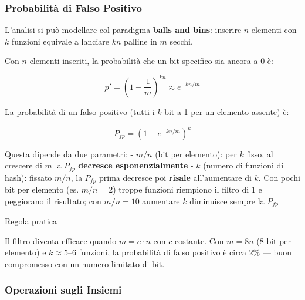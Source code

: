 \documentclass[
  italian,
  openany]{book}
\begin{document}
\subsubsection{Probabilità di Falso
Positivo}\label{probabilituxe0-di-falso-positivo}

L'analisi si può modellare col paradigma \textbf{balls and bins}:
inserire \(n\) elementi con \(k\) funzioni equivale a lanciare \(kn\)
palline in \(m\) secchi.

Con \(n\) elementi inseriti, la probabilità che un bit specifico sia
ancora a 0 è:

\[p' = \left(1 - \frac{1}{m}\right)^{kn} \approx e^{-kn/m}\]

La probabilità di un falso positivo (tutti i \(k\) bit a 1 per un
elemento assente) è:

\[P_{fp} = \left(1 - e^{-kn/m}\right)^k\]

Questa dipende da due parametri: - \textbf{\(m/n\)} (bit per elemento):
per \(k\) fisso, al crescere di \(m\) la \(P_{fp}\) \textbf{decresce
esponenzialmente} - \textbf{\(k\)} (numero di funzioni di hash): fissato
\(m/n\), la \(P_{fp}\) prima decresce poi \textbf{risale} all'aumentare
di \(k\). Con pochi bit per elemento (es. \(m/n = 2\)) troppe funzioni
riempiono il filtro di 1 e peggiorano il risultato; con \(m/n = 10\)
aumentare \(k\) diminuisce sempre la \(P_{fp}\)

\begin{callouttip}{Regola pratica}

Il filtro diventa efficace quando \(m = c \cdot n\) con \(c\) costante.
Con \(m = 8n\) (8 bit per elemento) e \(k \approx 5\text{–}6\) funzioni,
la probabilità di falso positivo è circa \(2\%\) --- buon compromesso
con un numero limitato di bit.

\end{callouttip}

\subsubsection{Operazioni sugli Insiemi}\label{operazioni-sugli-insiemi}
\end{document}
